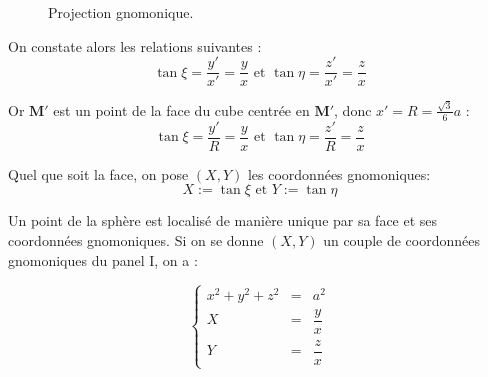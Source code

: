 \begin{figure}[htbp]
\begin{center}
\end{center}
\caption{Projection gnomonique.}
\label{fig: projection gnomonique}
\end{figure}  

On constate alors les relations suivantes :
\begin{equation}
\tan \xi = \dfrac{y'}{x'} = \dfrac{y}{x} \text{ et } \tan \eta = \dfrac{z'}{x'} = \dfrac{z}{x}
\end{equation}

Or $\mathbf{M}'$ est un point de la face du cube centrée en $\mathbf{M}'$, donc $x'=R=\frac{\sqrt{3}}{6}a$ :
\begin{equation}
\tan \xi = \dfrac{y'}{R} = \dfrac{y}{x} \text{ et } \tan \eta = \dfrac{z'}{R} = \dfrac{z}{x}
\end{equation}

Quel que soit la face, on pose $(X,Y)$ les coordonnées gnomoniques:
\begin{equation}
X:=\tan \xi \text{ et } Y:= \tan \eta
\end{equation}

Un point de la sphère est localisé de manière unique par sa face et ses coordonnées gnomoniques. Si on se donne $(X,Y)$ un couple de coordonnées gnomoniques du panel I, on a :

\begin{equation}
\left\lbrace
\begin{array}{rcl}
x^2+y^2+z^2 & = & a^2\\
X & = & \dfrac{y}{x} \\
Y & = & \dfrac{z}{x}
\end{array}
\right.
\end{equation}

